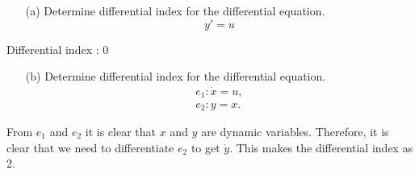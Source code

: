 \begin{enumerate}
	\item[(a)] Determine differential index for the differential equation.
	\begin{equation*}
		y' = u
	\end{equation*}
\end{enumerate}

Differential index : 0


\begin{enumerate}
	\item[(b)] Determine differential index for the differential equation.
	\begin{align*}
		e_1: \dot x = u,\\
		e_2: y = x.
	\end{align*}
\end{enumerate}

From $e_1$ and $e_2$ it is clear that $x$ and $y$ are dynamic variables. Therefore, it is clear that we need to differentiate $e_2$ to get $\dot y$. This makes the differential index as 2.